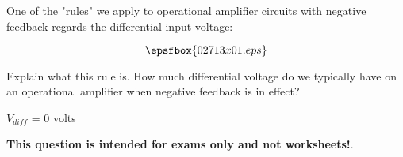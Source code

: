 

One of the "rules" we apply to operational amplifier circuits with negative feedback regards the differential input voltage:

$$\epsfbox{02713x01.eps}$$

Explain what this rule is.  How much differential voltage do we typically have on an operational amplifier when negative feedback is in effect?







$V_{diff}$ = 0 volts







{\bf This question is intended for exams only and not worksheets!}.




